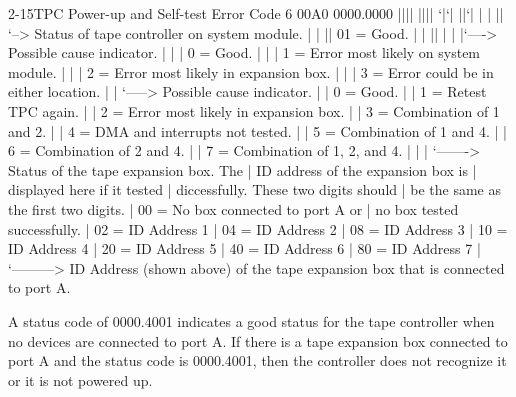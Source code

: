 \begin{ttfig}{2-15}{TPC Power-up and Self-test Error Code}
6  00A0 0000.0000
        |||| ||||
        `|`| ||`|
         | | || `--> Status of tape controller on system module.
         | | ||       01 = Good.
         | | ||
         | | |`----> Possible cause indicator.
         | | |        0 = Good.
         | | |        1 = Error most likely on system module.
         | | |        2 = Error most likely in expansion box.
         | | |        3 = Error could be in either location.
         | | `-----> Possible cause indicator.
         | |          0 = Good.
         | |          1 = Retest TPC again.
         | |          2 = Error most likely in expansion box.
         | |          3 = Combination of 1 and 2.
         | |          4 = DMA and interrupts not tested.
         | |          5 = Combination of 1 and 4.
         | |          6 = Combination of 2 and 4.
         | |          7 = Combination of 1, 2, and 4.
         | |          
         | `-------> Status of the tape expansion box. The
         |           ID address of the expansion box is
         |           displayed here if it tested
         |           diccessfully. These two digits should
         |           be the same as the first two digits.
         |            00 = No box connected to port A or
         |                 no box tested successfully.
         |            02 = ID Address 1
         |            04 = ID Address 2
         |            08 = ID Address 3
         |            10 = ID Address 4
         |            20 = ID Address 5
         |            40 = ID Address 6
         |            80 = ID Address 7
         |
         `---------> ID Address (shown above) of the tape
                     expansion box that is connected to
                     port A.
\end{ttfig}

A status code of 0000.4001 indicates a good status for the tape controller
when no devices are connected to port A. If there is a tape expansion box
connected to port A and the status code is 0000.4001, then the controller
does not recognize it or it is not powered up.

